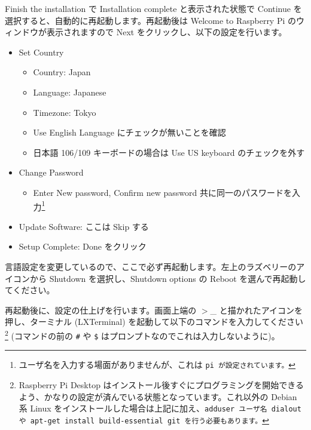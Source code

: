 \documentclass[a4j,oneside]{ujbook}
\begin{document}
Finish the installation で Installation complete と表示された状態で Continue を選択すると、自動的に再起動します。再起動後は Welcome to Raspberry Pi のウィンドウが表示されますので Next をクリックし、以下の設定を行います。

\begin{itemize}
 \item Set Country
  \begin{itemize}
   \item Country: Japan
   \item Language: Japanese
   \item Timezone: Tokyo
   \item Use English Language にチェックが無いことを確認
   \item 日本語 106/109 キーボードの場合は Use US keyboard のチェックを外す
  \end{itemize}
  \item Change Password
  \begin{itemize}
   \item Enter New password, Confirm new password 共に同一のパスワードを入力\footnote{ユーザ名を入力する場面がありませんが、これは \tt{pi} が設定されています。}
  \end{itemize}
  \item Update Software: ここは Skip する
  \item Setup Complete: Done をクリック
\end{itemize}

言語設定を変更しているので、ここで必ず再起動します。左上のラズベリーのアイコンから Shutdown を選択し、Shutdown options の Reboot を選んで再起動してください。

再起動後に、設定の仕上げを行います。画面上端の $>$\_ と描かれたアイコンを押し、ターミナル (LXTerminal) を起動して以下のコマンドを入力してください\footnote{Raspberry Pi Desktop はインストール後すぐにプログラミングを開始できるよう、かなりの設定が済んでいる状態となっています。これ以外の Debian 系 Linux をインストールした場合は上記に加え、\tt{adduser ユーザ名 dialout} や \tt{apt-get install build-essential git} を行う必要もあります。} (コマンドの前の \verb+#+ や \verb+$+ はプロンプトなのでこれは入力しないように)。
\end{document}
